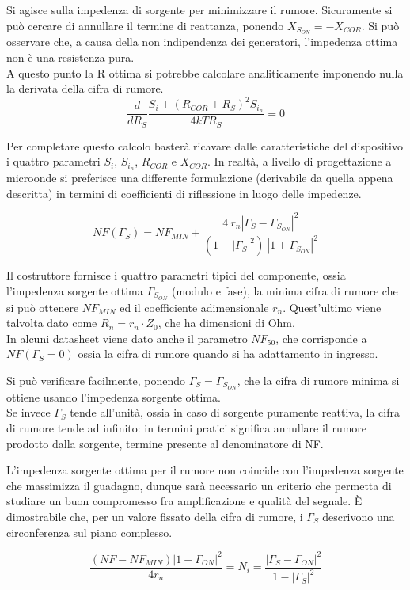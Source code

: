 Si agisce sulla impedenza di sorgente per minimizzare il rumore. Sicuramente si può cercare di annullare il termine di reattanza, ponendo $X_{S_{ON}} = - X_{COR}$.
Si può osservare che, a causa della non indipendenza dei generatori, l'impedenza ottima non è una resistenza pura.\\
A questo punto la R ottima si potrebbe calcolare analiticamente imponendo nulla la derivata della cifra di rumore.
\[
\frac{d}{dR_S} \frac{S_i + (R_{COR} + R_S)^2 S_{i_n}}{4kT R_S} = 0
\]

Per completare questo calcolo basterà ricavare dalle caratteristiche del dispositivo i quattro parametri $S_i$, $S_{i_n}$, $R_{COR}$ e $X_{COR}$. In realtà, a livello di progettazione a microonde si preferisce una differente formulazione (derivabile da quella appena descritta) in termini di coefficienti di riflessione in luogo delle impedenze.

\[
NF(\Gamma_S) = NF_{MIN} + \frac{4 ~r_n |\Gamma_S - \Gamma_{S_{ON}}|^2}{(1-|\Gamma_S|^2) ~|1+\Gamma_{S_{ON}}|^2}
\]

Il costruttore fornisce i quattro parametri tipici del componente, ossia l'impedenza sorgente ottima $\Gamma_{S_{ON}}$ (modulo e fase), la minima cifra di rumore che si può ottenere $NF_{MIN}$ ed il coefficiente adimensionale $r_n$. Quest'ultimo viene talvolta dato come $R_n = r_n \cdot Z_0$, che ha dimensioni di Ohm.
\\
In alcuni datasheet viene dato anche il parametro $NF_{50}$, che corrisponde a $NF(\Gamma_S = 0)$ ossia la cifra di rumore quando si ha adattamento in ingresso.

Si può verificare facilmente, ponendo $\Gamma_S = \Gamma_{S_{ON}}$, che la cifra di rumore minima si ottiene usando l'impedenza sorgente ottima.\\
Se invece $\Gamma_S$ tende all'unità, ossia in caso di sorgente puramente reattiva, la cifra di rumore tende ad infinito: in termini pratici significa annullare il rumore prodotto dalla sorgente, termine presente al denominatore di NF.

L'impedenza sorgente ottima per il rumore non coincide con l'impedenza sorgente che massimizza il guadagno, dunque sarà necessario un criterio che permetta di studiare un buon compromesso fra amplificazione e qualità del segnale.
È dimostrabile che, per un valore fissato della cifra di rumore, i $\Gamma_S$ descrivono una circonferenza sul piano complesso.

\[
\frac{(NF - NF_{MIN})|1+\Gamma_{ON}|^2}{4r_n} = N_i =
\frac{|\Gamma_S - \Gamma_{ON}|^2}{1-|\Gamma_S|^2}
\]

